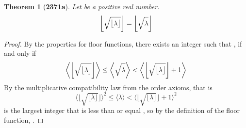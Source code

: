 \documentclass[preview]{standalone}
\newtheorem*{theorem*}{Theorem}
\begin{document}
\begin{theorem*}[\textbf{2371a}]
    Let \bm{$\lambda$} be a positive real number. 
    \begin{equation*}
        \relax{
            \bigg \lfloor 
                \sqrt{ \strut \big \lfloor \lambda \big \rfloor } 
            \bigg \rfloor 
                = 
            \bigg \lfloor \sqrt{ \strut \lambda} \bigg \rfloor
        }
    \end{equation*}
\end{theorem*}

\begin{proof}
    By the properties for floor functions,
    there exists an integer 
    \bm{$
        \big \lfloor \sqrt{ 
            \lfloor \lambda \rfloor 
        } \big \rfloor
    $} such that 
    \bm{$
        \big \lfloor \sqrt{ \lambda} \big \rfloor
            = 
        \big \lfloor \sqrt{ 
            \lfloor \lambda \rfloor 
        } \big \rfloor 
    $},
    if and only if
    \begin{equation*}
        \bigg \langle 
            \bigg \lfloor 
                \sqrt{ 
                    \big \lfloor \lambda \big \rfloor
                }
            \bigg \rfloor
        \bigg \rangle
            \leq
        \bigg \langle
            \sqrt{ \strut \lambda }
        \bigg \rangle
            <
        \bigg \langle 
            \bigg \lfloor 
                \sqrt{ 
                    \big \lfloor \lambda \big \rfloor
                }
            \bigg \rfloor
                +
            1
        \bigg \rangle
    \end{equation*}
    By the multiplicative compatibility law from the order axioms, that is
    \begin{equation*}
        \bigg \langle 
            \bigg \lfloor 
                \sqrt{ 
                    \big \lfloor \lambda \big \rfloor
                }
            \bigg \rfloor
        \bigg \rangle
            ^2
            \leq
        \bigg \langle
            \lambda
        \bigg \rangle
            <
        \bigg \langle 
            \bigg \lfloor 
                \sqrt{ 
                    \big \lfloor \lambda \big \rfloor
                }
            \bigg \rfloor
                +
            1
        \bigg \rangle
        ^2
    \end{equation*}
    \bm{$\big \lfloor \lambda \big \rfloor$} 
    is the largest integer that is less than or equal \bm{$\lambda$},
    so by the definition of the floor function, 
    \bm{$\big \lfloor \lambda \big \rfloor \leq \lambda$}. 

\end{proof}
\end{document}
